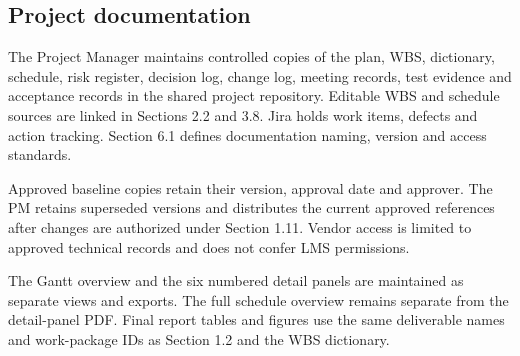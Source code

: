 \subsection{Project documentation}\label{sec:5.4}
The Project Manager maintains controlled copies of the plan, WBS, dictionary, schedule, risk register, decision log, change log, meeting records, test evidence and acceptance records in the shared project repository. Editable WBS and schedule sources are linked in Sections 2.2 and 3.8. Jira holds work items, defects and action tracking. Section 6.1 defines documentation naming, version and access standards.


Approved baseline copies retain their version, approval date and approver. The PM retains superseded versions and distributes the current approved references after changes are authorized under Section 1.11. Vendor access is limited to approved technical records and does not confer LMS permissions.


The Gantt overview and the six numbered detail panels are maintained as separate views and exports. The full schedule overview remains separate from the detail-panel PDF. Final report tables and figures use the same deliverable names and work-package IDs as Section 1.2 and the WBS dictionary.
